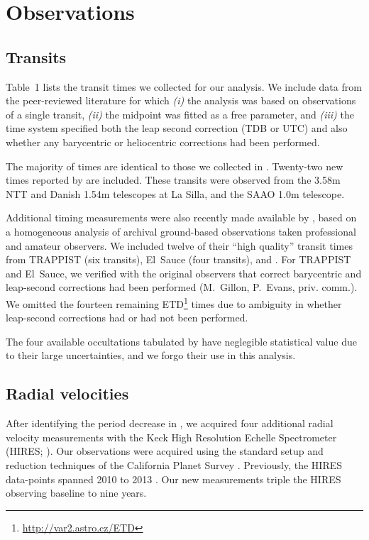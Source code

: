 \documentclass[12pt,twocolumn,tighten]{aastex62}
\begin{document}
\section{Observations}
\label{sec:observations}

\subsection{Transits}

Table~1 lists the transit times we collected for our analysis.  We
include data from the peer-reviewed literature for which {\it (i)} the
analysis was based on observations of a single transit, {\it (ii)} the
midpoint was fitted as a free parameter, and {\it (iii)} the time
system specified both the leap second correction (TDB or UTC) and also
whether any barycentric or heliocentric corrections had been
performed.

The majority of times are identical to those we collected in
.  Twenty-two new times reported by
\citet{southworth_transit_2019} are included.  These transits were
observed from the 3.58m NTT and Danish 1.54m telescopes at La Silla,
and the SAAO 1.0m telescope.

Additional timing measurements were also recently made available by
\citet{baluev_2019}, based on a homogeneous analysis of archival
ground-based observations taken professional and amateur observers.
We included twelve of their ``high quality'' transit times from
TRAPPIST (six transits), El~Sauce (four transits), and
\citet{petrucci_no_2013}.  For TRAPPIST and El~Sauce, we verified with
the original observers that correct barycentric and leap-second
corrections had been performed (M.~Gillon, P.~Evans, priv{.} comm{.}).
We omitted the fourteen remaining \citeauthor{baluev_2019}
ETD\footnote{\url{http://var2.astro.cz/ETD}} times due to ambiguity in
whether leap-second corrections had or had not been performed.

The four available occultations tabulated by
 have neglegible statistical value due
to their large uncertainties, and we forgo their use in this analysis.

\subsection{Radial velocities}

After identifying the period decrease in
, we acquired four additional radial
velocity measurements with the Keck High Resolution Echelle
Spectrometer (HIRES; \citealt{vogt_hires_1994}).  Our observations
were acquired using the standard setup and reduction techniques of the
California Planet Survey \citep{howard_cps_2010}.  Previously, the
HIRES data-points spanned 2010 to 2013 \citep{knutson_friends_2014}.
Our new measurements triple the HIRES observing baseline to nine
years.
\end{document}
